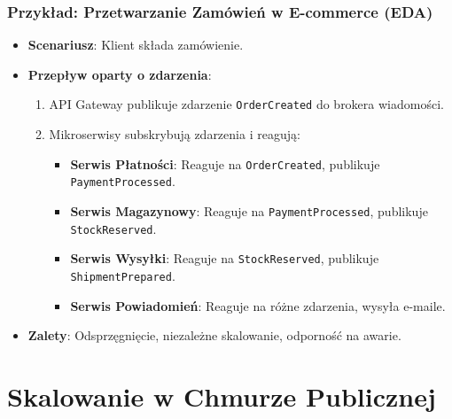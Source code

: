 \documentclass[aspectratio=169,xcolor=table]{beamer}
\begin{document}
\begin{frame}
  \frametitle{Przykład: Przetwarzanie Zamówień w E-commerce (EDA)}
  \begin{itemize}
    \item \textbf{Scenariusz}: Klient składa zamówienie.
    \item \textbf{Przepływ oparty o zdarzenia}:
        \begin{enumerate}
            \item API Gateway publikuje zdarzenie \texttt{OrderCreated} do brokera wiadomości.
            \item Mikroserwisy subskrybują zdarzenia i reagują:
                \begin{itemize}
                    \item \textbf{Serwis Płatności}: Reaguje na \texttt{OrderCreated}, publikuje \texttt{PaymentProcessed}.
                    \item \textbf{Serwis Magazynowy}: Reaguje na \texttt{PaymentProcessed}, publikuje \texttt{StockReserved}.
                    \item \textbf{Serwis Wysyłki}: Reaguje na \texttt{StockReserved}, publikuje \texttt{ShipmentPrepared}.
                    \item \textbf{Serwis Powiadomień}: Reaguje na różne zdarzenia, wysyła e-maile.
                \end{itemize}
        \end{enumerate}
    \item \textbf{Zalety}: Odsprzęgnięcie, niezależne skalowanie, odporność na awarie.
  \end{itemize}
\end{frame}

\section{Skalowanie w Chmurze Publicznej}
\end{document}
